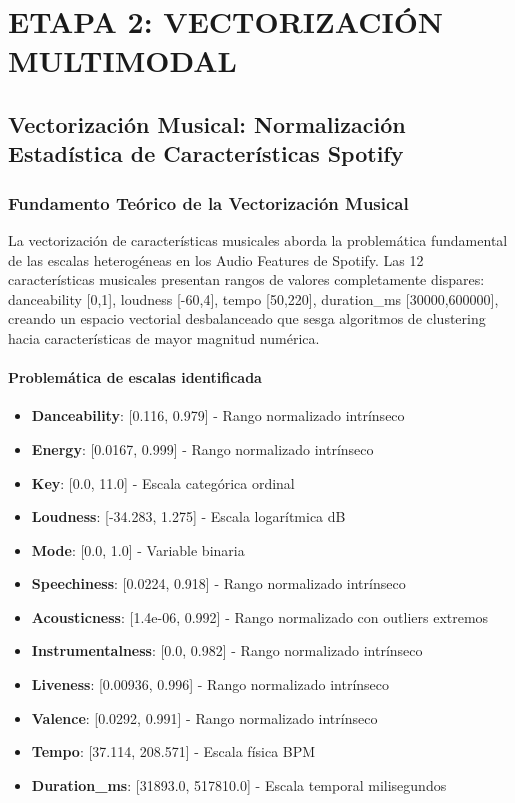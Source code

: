 \documentclass[12pt,a4paper]{report}
\begin{document}
\chapter{ETAPA 2: VECTORIZACIÓN MULTIMODAL}

\section{Vectorización Musical: Normalización Estadística de Características Spotify}

\subsection{Fundamento Teórico de la Vectorización Musical}

La vectorización de características musicales aborda la problemática fundamental de las escalas heterogéneas en los Audio Features de Spotify. Las 12 características musicales presentan rangos de valores completamente dispares: danceability [0,1], loudness [-60,4], tempo [50,220], duration\_ms [30000,600000], creando un espacio vectorial desbalanceado que sesga algoritmos de clustering hacia características de mayor magnitud numérica.

\subsubsection{Problemática de escalas identificada}

\begin{itemize}
    \item \textbf{Danceability}: [0.116, 0.979] - Rango normalizado intrínseco
    \item \textbf{Energy}: [0.0167, 0.999] - Rango normalizado intrínseco
    \item \textbf{Key}: [0.0, 11.0] - Escala categórica ordinal
    \item \textbf{Loudness}: [-34.283, 1.275] - Escala logarítmica dB
    \item \textbf{Mode}: [0.0, 1.0] - Variable binaria
    \item \textbf{Speechiness}: [0.0224, 0.918] - Rango normalizado intrínseco
    \item \textbf{Acousticness}: [1.4e-06, 0.992] - Rango normalizado con outliers extremos
    \item \textbf{Instrumentalness}: [0.0, 0.982] - Rango normalizado intrínseco
    \item \textbf{Liveness}: [0.00936, 0.996] - Rango normalizado intrínseco
    \item \textbf{Valence}: [0.0292, 0.991] - Rango normalizado intrínseco
    \item \textbf{Tempo}: [37.114, 208.571] - Escala física BPM
    \item \textbf{Duration\_ms}: [31893.0, 517810.0] - Escala temporal milisegundos
\end{itemize}
\end{document}
